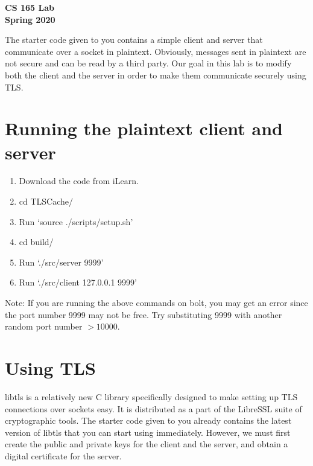 \documentclass[11pt]{article}
\begin{document}
\begin{center}
{\Large\bf CS 165 Lab \\ Spring 2020\\}
\end{center}
\vspace{0.25in}

The starter code given to you contains a simple client and server that communicate over a socket in plaintext.
Obviously, messages sent in plaintext are not secure and can be read by a third party.
Our goal in this lab is to modify both the client and the server in order to make them communicate securely using TLS.

\section{Running the plaintext client and server}
\begin{enumerate}
    \item Download the code from iLearn.
    \item cd TLSCache/
    \item Run `source ./scripts/setup.sh'
    \item cd build/
    \item Run `./src/server 9999'
    \item Run `./src/client 127.0.0.1 9999'
\end{enumerate}
Note: If you are running the above commands on bolt, you may get an error since the port number 9999 may not be free.
Try substituting 9999 with another random port number $> 10000$. 


\section{Using TLS}
libtls is a relatively new C library specifically designed to make setting up TLS connections over sockets easy. It is distributed as a part of the LibreSSL suite of cryptographic tools.
The starter code given to you already contains the latest version of libtls that you can start using immediately. However, we must first create the public and private keys for the client and the server, and obtain a digital certificate for the server.
\end{document}
